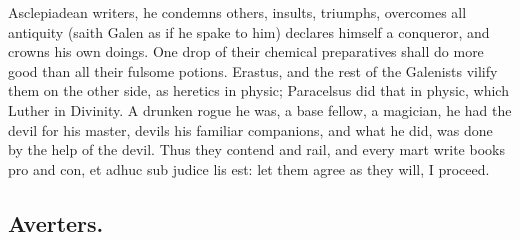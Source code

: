 Asclepiadean writers, he condemns others, insults, triumphs,
overcomes all antiquity (saith Galen as if he spake to him) declares
himself a conqueror, and crowns his own doings. One drop of their
chemical preparatives shall do more good than all their fulsome
potions. Erastus, and the rest of the Galenists vilify them on the
other side, as heretics in physic; Paracelsus did that in physic,
which Luther in Divinity. A drunken rogue he was, a base fellow,
a magician, he had the devil for his master, devils his familiar
companions, and what he did, was done by the help of the devil. Thus
they contend and rail, and every mart write books pro and con, et adhuc
sub judice lis est: let them agree as they will, I proceed.

\subsection{Averters.}

